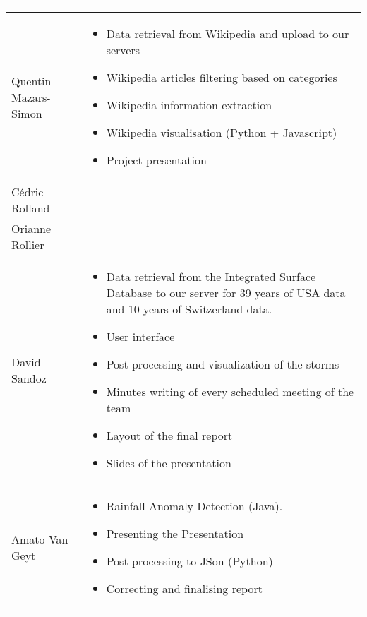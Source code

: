 \begin{longtable}{|l|p{10.5cm}|}
\begin{itemize}
\end{itemize}\\
\hline
Quentin Mazars-Simon & \begin{itemize}
	\item Data retrieval from Wikipedia and upload to our servers
	\item Wikipedia articles filtering based on categories
	\item Wikipedia information extraction
	\item Wikipedia visualisation (Python + Javascript)
	\item Project presentation
\end{itemize}\\
\hline
Cédric Rolland &  \\
\hline
Orianne Rollier & \\
\hline
David Sandoz &
\begin{itemize}
	\item Data retrieval from the Integrated Surface Database to our server for 39 years of USA data and 10 years of Switzerland data.
	\item User interface
	\item Post-processing and visualization of the storms
	\item Minutes writing of every scheduled meeting of the team
	\item Layout of the final report
	\item Slides of the presentation
\end{itemize}\\
\hline
Amato Van Geyt & \begin{itemize}
	\item Rainfall Anomaly Detection (Java).
	\item Presenting the Presentation
	\item Post-processing to JSon (Python)
	\item Correcting and finalising report
\end{itemize}\\ 
\hline
\end{longtable}
